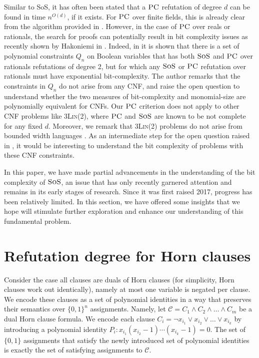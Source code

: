 \documentclass[11pt]{article}
\newcommand{\sos}{\text{\sc{SoS}}}
\newcommand{\Cc}{\mathcal{C}}
\newcommand{\PC}{\textsc{PC}}
\newcommand{\1}{\textbf{1}}
\begin{document}
Similar to SoS, it has often been stated that a $\PC$ refutation of degree $d$ can be found in time $n^{O(d)}$, if it exists. For $\PC$ over finite fields, this is already clear from the algorithm provided in \cite{CleggEI96}. However, in the case of $\PC$ over reals or rationals, the search for proofs can potentially result in bit complexity issues as recently shown by Hakoniemi in \cite{Hakoniemi21}. Indeed, in \cite{Hakoniemi21} it is shown that there is a set of polynomial constraints $Q_n$ on Boolean variables that has both $\sos$ and $\PC$ over rationals refutations of degree 2, but for which any $\sos$ or $\PC$ refutation over rationals must have exponential bit-complexity. The author remarks that the constraints in $Q_n$ do not arise from any CNF, and raise the open question to understand whether the
two measures of bit-complexity and monomial-size are polynomially equivalent for CNFs. Our $\PC$ criterion does not apply to other CNF problems like \textsc{3Lin(2)}, where $\PC$ and $\sos$ are known to be not complete for any fixed $d$. Moreover, we remark that \textsc{3Lin(2)} problems do not arise from bounded width languages \cite{BartoK14}.
As an intermediate step for the open question raised in \cite{Hakoniemi21}, it would be interesting to understand the bit complexity of problems with these CNF constraints.



In this paper, we have made partial advancements in the understanding of the bit complexity of \(\sos\), an issue that has only recently garnered attention and remains in its early stages of research. Since it was first raised 2017, progress has been relatively limited. In this section, we have offered some insights that we hope will stimulate further exploration and enhance our understanding of this fundamental problem.


{

}

\newpage

\appendix
\section{Refutation degree for Horn clauses}\label{sect:ref_deg}
Consider the case all clauses are duals of Horn clauses (for simplicity, Horn clauses work out identically), namely at most one variable is negated per clause. 
We encode these clauses as a set of polynomial identities in a way that preserves their semantics over $\{0,1\}^n$ assignments.
Namely, let $\Cc=C_1\wedge C_2 \wedge \ldots \wedge C_m$ be a dual Horn clause formula. We encode each clause $C_i=\neg x_{i_1}\lor x_{i_2}\lor \ldots \lor x_{i_k}$ by introducing a polynomial identity $P_i:x_{i_1}(x_{i_2}-1)\cdots (x_{i_k}-1)=0$. The set of $\{0,1\}$ assignments that satisfy the newly introduced set of polynomial identities is exactly the set of satisfying assignments to $\Cc$.
\end{document}
